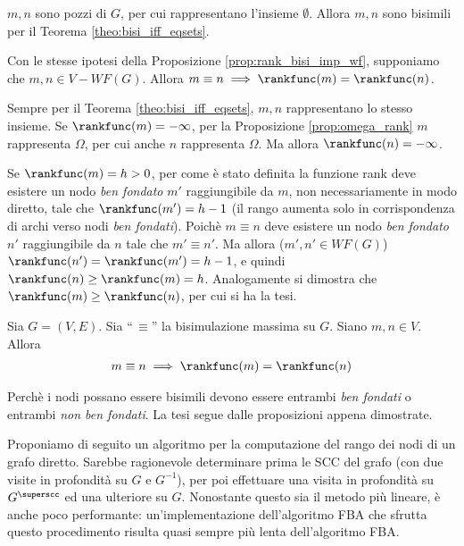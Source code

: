 \begin{proof2}
    $m,n$ sono pozzi di $G$, per cui rappresentano l'insieme $\emptyset$. Allora $m,n$ sono bisimili per il Teorema \ref{theo:bisi_iff_eqsets}.
\end{proof2}
\begin{proposition}
    Con le stesse ipotesi della Proposizione \ref{prop:rank_bisi_imp_wf}, supponiamo che $m,n \in V - WF(G)$. Allora $m \equiv n \implies \rankfunc(m) = \rankfunc(n)$.
\end{proposition}
\begin{proof2}
    Sempre per il Teorema \ref{theo:bisi_iff_eqsets}, $m,n$ rappresentano lo stesso insieme. Se $\rankfunc(m) = -\infty$, per la Proposizione \ref{prop:omega_rank} $m$ rappresenta $\Omega$, per cui anche $n$ rappresenta $\Omega$. Ma allora $\rankfunc(n) = -\infty$.

    Se $\rankfunc(m) = h > 0$, per come è stato definita la funzione rank deve esistere un nodo \emph{ben fondato} $m'$ raggiungibile da $m$, non necessariamente in modo diretto, tale che $\rankfunc(m') = h-1$ (il rango aumenta solo in corrispondenza di archi verso nodi \emph{ben fondati}). Poichè $m \equiv n$ deve esistere un nodo \emph{ben fondato} $n'$ raggiungibile da $n$ tale che $m' \equiv n'$. Ma allora ($m',n' \in WF(G)$) $\rankfunc(n') = \rankfunc(m') = h-1$, e quindi $\rankfunc(n) \geq \rankfunc(m) = h$. Analogamente si dimostra che $\rankfunc(m) \geq \rankfunc(n)$, per cui si ha la tesi.
\end{proof2}
\begin{theorem}
    \label{theo:bisi_rank}
    Sia $G = (V,E)$. Sia ``\,$\equiv$'' la bisimulazione massima su $G$. Siano $m,n \in V$. Allora
    \begin{gather*}
        m \equiv n \implies \rankfunc(m) = \rankfunc(n)
    \end{gather*}
\end{theorem}
\begin{proof2}
    Perchè i nodi possano essere bisimili devono essere entrambi \emph{ben fondati} o entrambi \emph{non ben fondati}. La tesi segue dalle proposizioni appena dimostrate.
\end{proof2}

Proponiamo di seguito un algoritmo per la computazione del rango dei nodi di un grafo diretto. Sarebbe ragionevole determinare prima le SCC del grafo (con due visite in profondità su $G$ e $G^{-1}$), per poi effettuare una visita in profondità su $G^{\superscc}$ ed una ulteriore su $G$. Nonostante questo sia il metodo più lineare, è anche poco performante: un'implementazione dell'algoritmo FBA che sfrutta questo procedimento risulta quasi sempre più lenta dell'algoritmo FBA.

